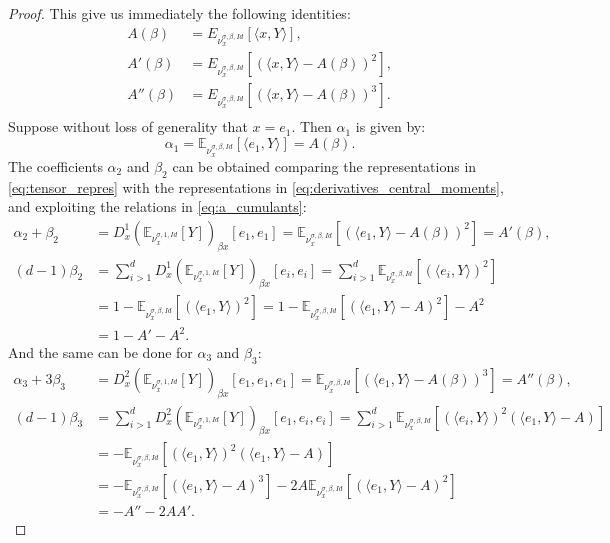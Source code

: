 \documentclass{article}
\numberwithin{theorem}{section}
\begin{document}
\begin{proof}
This give us immediately the following identities:
\begin{equation}
\label{eq:a_cumulants}
\begin{aligned}
A(\beta)&=E_{\nu_x^{\sigma,\beta, Id}}[\langle x, Y\rangle],\\
A'(\beta)&= E_{\nu_x^{\sigma,\beta, Id}}[(\langle x, Y\rangle-A(\beta))^2],\\
A''(\beta)&= E_{\nu_x^{\sigma,\beta, Id}}[(\langle x, Y\rangle-A(\beta))^3].\\
\end{aligned}
\end{equation}
Suppose without loss of generality that $x=e_1$. Then $\alpha_1$ is given by:
\begin{equation}
\label{eq:alpha_1}
\alpha_1 = \mathbb{E}_{\nu_{x}^{\sigma,\beta,Id}}[\langle e_1 ,Y\rangle] = A(\beta). 
\end{equation}
The coefficients $\alpha_2$ and $\beta_2$ can be obtained comparing the representations in \eqref{eq:tensor_repres} with the representations in \eqref{eq:derivatives_central_moments}, and exploiting the relations in \eqref{eq:a_cumulants}:
\begin{equation}
\label{eq:beta_2}
\begin{aligned}
\alpha_2 + \beta_2&= D^1_x\left(\mathbb{E}_{\nu_x^{\sigma,1,Id}}[Y] \right)_{\beta x}[e_1,e_1]=\mathbb{E}_{\nu_x^{\sigma, \beta,Id}}[(\langle e_1 ,Y\rangle - A(\beta))^2]=A'(\beta),\\
(d-1)\beta_2 &= \sum_{i>1}^d D^1_x\left(\mathbb{E}_{\nu_x^{\sigma,1, Id}}[Y] \right)_{\beta x}[e_i,e_i]=\sum_{i>1}^d \mathbb{E}_{\nu_x^{\sigma, \beta,Id}}[(\langle e_i ,Y\rangle )^2]\\
&=1-\mathbb{E}_{\nu_x^{\sigma, \beta,Id}}[(\langle e_1 ,Y\rangle )^2]=1-\mathbb{E}_{\nu_x^{\sigma, \beta,Id}}[(\langle e_1 ,Y\rangle -A)^2] - A^2 \\
&=1- A' - A^2.
\end{aligned}
\end{equation}
And the same can be done for $\alpha_3$ and $\beta_3$:
\begin{align*}
\alpha_3+3\beta_3 &= D^2_x \left(\mathbb{E}_{\nu_x^{\sigma, 1,Id}}[Y] \right)_{\beta x}[e_1,e_1,e_1]=\mathbb{E}_{\nu_x^{\sigma, \beta,Id}}[(\langle e_1 ,Y\rangle - A(\beta))^3]= A''(\beta),\\
(d-1)\beta_3 &= \sum_{i>1}^d D_x^2\left(\mathbb{E}_{\nu_x^{\sigma, 1,Id}}[Y] \right)_{\beta x}[e_1,e_i,e_i]=\sum_{i>1}^d \mathbb{E}_{\nu_x^{\sigma, \beta,Id}}[(\langle e_i ,Y\rangle )^2(\langle e_1, Y\rangle-A)]\\
&=-\mathbb{E}_{\nu_x^{\sigma, \beta,Id}}[(\langle e_1 ,Y\rangle )^2(\langle e_1, Y\rangle-A)]\\
&=-\mathbb{E}_{\nu_x^{\sigma, \beta,Id}}[(\langle e_1 ,Y\rangle -A)^3] -2A \mathbb{E}_{\nu_x^{\sigma, \beta,Id}}[(\langle e_1 ,Y\rangle -A)^2]\\
&=- A'' - 2AA'.
\end{align*}



\end{proof}
\end{document}
